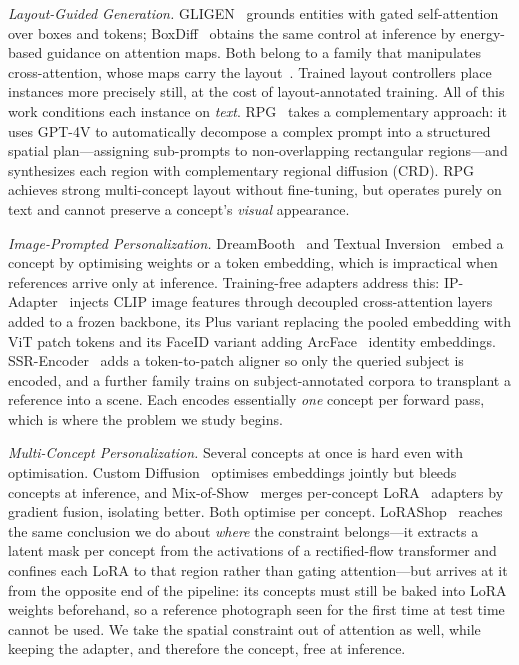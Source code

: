 \documentclass[10pt,twocolumn,letterpaper]{article}
\begin{document}
\noindent\textit{Layout-Guided Generation.}
GLIGEN~\cite{li2023gligen} grounds entities with gated self-attention over
boxes and tokens; BoxDiff~\cite{xie2023boxdiff} obtains the same control at
inference by energy-based guidance on attention maps.  Both belong to a family that manipulates
cross-attention, whose maps carry the layout~\cite{hertz2023prompt}.  Trained
layout controllers place instances more precisely still, at the cost of
layout-annotated training.  All of this work conditions each instance on
\emph{text}.
RPG~\cite{yang2024mastering} takes a complementary approach: it
uses GPT-4V to automatically decompose a complex prompt into a
structured spatial plan—assigning sub-prompts to non-overlapping
rectangular regions—and synthesizes each region with complementary
regional diffusion (CRD).  RPG achieves strong multi-concept layout
without fine-tuning, but operates purely on text and cannot preserve
a concept's \emph{visual} appearance.

\noindent\textit{Image-Prompted Personalization.}
DreamBooth~\cite{ruiz2023dreambooth} and Textual
Inversion~\cite{gal2022image} embed a concept by optimising weights or a
token embedding, which is impractical when references arrive only at
inference.  Training-free adapters address this: IP-Adapter~\cite{ye2023ip}
injects CLIP image features through decoupled cross-attention layers added to
a frozen backbone, its Plus variant replacing the pooled embedding with ViT
patch tokens and its FaceID variant adding
ArcFace~\cite{deng2019arcface} identity embeddings.
SSR-Encoder~\cite{zhang2024ssr} adds a token-to-patch aligner so only the
queried subject is encoded, and a further family trains on subject-annotated
corpora to transplant a reference into a scene.  Each encodes essentially \emph{one} concept per forward pass, which is where
the problem we study begins.

\noindent\textit{Multi-Concept Personalization.}
Several concepts at once is hard even with optimisation.  Custom
Diffusion~\cite{kumari2023multi} optimises embeddings jointly but bleeds
concepts at inference, and Mix-of-Show~\cite{gu2023mix} merges per-concept
LoRA~\cite{hu2022lora} adapters by gradient fusion, isolating better.  Both
optimise per concept.  LoRAShop~\cite{dalva2025lorashop} reaches the same conclusion we do about
\emph{where} the constraint belongs---it extracts a latent mask per concept
from the activations of a rectified-flow transformer and confines each LoRA to
that region rather than gating attention---but arrives at it from the opposite
end of the pipeline: its concepts must still be baked into LoRA weights
beforehand, so a reference photograph seen for the first time at test time
cannot be used.  We take the spatial constraint out of attention as well,
while keeping the adapter, and therefore the concept, free at inference.
\end{document}

